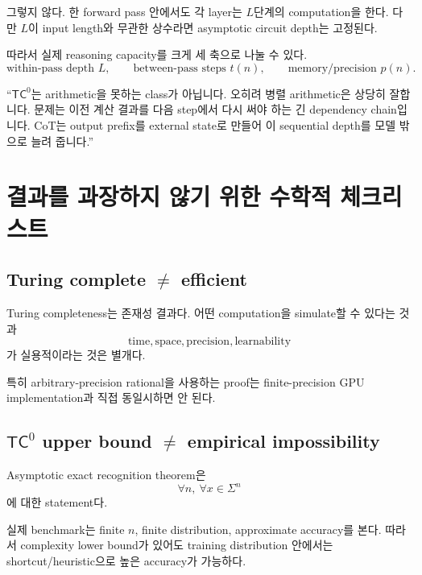 \documentclass[11pt,a4paper,oneside,openany]{memoir}
\theoremstyle{definition}
\newcommand{\TC}{\mathsf{TC}}
\begin{document}
그렇지 않다. 한 forward pass 안에서도 각 layer는 $L$단계의 computation을 한다.
다만 $L$이 input length와 무관한 상수라면 asymptotic circuit depth는 고정된다.

따라서 실제 reasoning capacity를 크게 세 축으로 나눌 수 있다.
\[
\text{within-pass depth }L,
\qquad
\text{between-pass steps }t(n),
\qquad
\text{memory/precision }p(n).
\]

\begin{presentbox}
``$\TC^0$는 arithmetic을 못하는 class가 아닙니다. 오히려 병렬 arithmetic은 상당히 잘합니다. 문제는 이전 계산 결과를 다음 step에서 다시 써야 하는 긴 dependency chain입니다. CoT는 output prefix를 external state로 만들어 이 sequential depth를 모델 밖으로 늘려 줍니다.''
\end{presentbox}

\chapter{결과를 과장하지 않기 위한 수학적 체크리스트}

\section{\texorpdfstring{Turing complete $\neq$ efficient}{Turing complete != efficient}}

Turing completeness는 존재성 결과다.
어떤 computation을 simulate할 수 있다는 것과
\[
\text{time},\text{space},\text{precision},\text{learnability}
\]
가 실용적이라는 것은 별개다.

특히 arbitrary-precision rational을 사용하는 proof는 finite-precision GPU implementation과 직접 동일시하면 안 된다.

\section{\texorpdfstring{$\TC^0$ upper bound $\neq$ empirical impossibility}{TC0 upper bound != empirical impossibility}}

Asymptotic exact recognition theorem은
\[
\forall n,\ \forall x\in\Sigma^n
\]
에 대한 statement다.

실제 benchmark는 finite $n$, finite distribution, approximate accuracy를 본다.
따라서 complexity lower bound가 있어도 training distribution 안에서는 shortcut/heuristic으로 높은 accuracy가 가능하다.
\end{document}
